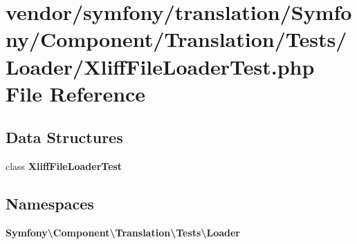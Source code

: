 \section{vendor/symfony/translation/\+Symfony/\+Component/\+Translation/\+Tests/\+Loader/\+Xliff\+File\+Loader\+Test.php File Reference}
\label{_xliff_file_loader_test_8php}
\subsection*{Data Structures}
\begin{DoxyCompactItemize}
\item 
class {\bf Xliff\+File\+Loader\+Test}
\end{DoxyCompactItemize}
\subsection*{Namespaces}
\begin{DoxyCompactItemize}
\item 
 {\bf Symfony\textbackslash{}\+Component\textbackslash{}\+Translation\textbackslash{}\+Tests\textbackslash{}\+Loader}
\end{DoxyCompactItemize}
